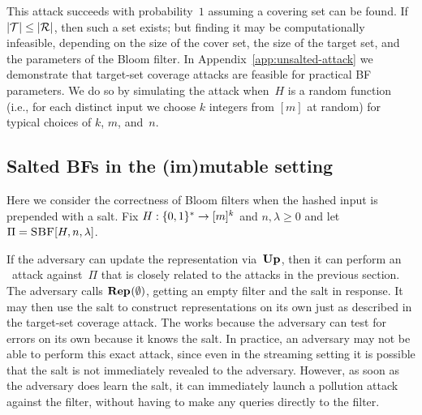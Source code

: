 This  attack succeeds with probability~$1$ assuming a covering set can
be found.  If $|\mathcal{T}| \leq |\mathcal{R}|$, then such a set exists; but finding it may be
computationally infeasible, depending on the size of the cover set, the size of
the target set, and the parameters of the Bloom filter.
%
In Appendix~\ref{app:unsalted-attack} we demonstrate that target-set coverage
attacks are feasible for practical BF parameters. We do so by simulating the
attack when~$H$ is a random function (i.e., for each distinct input we choose
$k$ integers from $[m]$ at random) for typical choices of $k$, $m$, and~$n$.


\subsection{Salted BFs in the (im)mutable setting}\label{sec:sbf}
%
Here we consider the correctness of Bloom filters when the hashed input is
prepended with a salt.
%
Fix $H:\{0,1\}^*\to[m]^k$ and $n,\lambda\geq0$ and let
$\Pi = \textnormal{\textsc{SBF}}[H,n,\lambda]$.

If the adversary can update the representation via~$\textup{\textbf{Up}}\hspace{0.5pt}$, then it can perform
an \errep\ attack against~$\Pi$ that is closely related to the attacks in the
previous section.  The adversary calls $\textup{\textbf{Rep}}\hspace{0.5pt}(\emptyset)$, getting an empty
filter and the salt in response.  It may then use the salt to construct
representations on its own just as described in the target-set coverage attack.
%
The works because the adversary can test for errors on its own because it knows
the salt.  In practice, an adversary may not be able to perform this exact
attack, since even in the streaming setting it is possible that the salt is not
immediately revealed to the adversary. However, as soon as the adversary does
learn the salt, it can immediately launch a pollution attack against the filter,
without having to make any queries directly to the filter.
%

